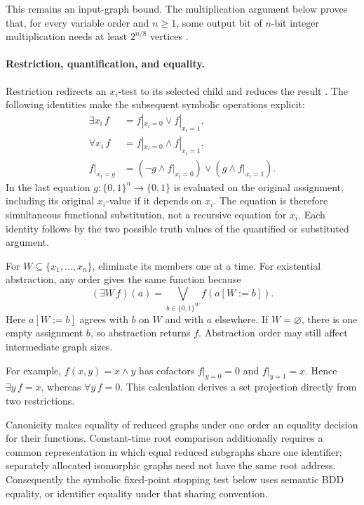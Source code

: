This remains an input-graph bound. The multiplication argument below
proves that, for every variable order and \(n\geq1\), some output bit of
\(n\)-bit integer multiplication needs at least \(2^{n/8}\) vertices
\cite[\S\S4.3, 6 and app.]{Bryant1986}.

\paragraph{Restriction, quantification, and equality.}
Restriction redirects an \(x_i\)-test to its selected child and reduces the
result \cite[\S4.4]{Bryant1986}. The following identities make the subsequent
symbolic operations explicit:
\[
\begin{aligned}
 \exists x_i\,f&=f|_{x_i=0}\lor f|_{x_i=1},\\
 \forall x_i\,f&=f|_{x_i=0}\land f|_{x_i=1},\\
 f|_{x_i=g}
   &=(\neg g\land f|_{x_i=0})\lor(g\land f|_{x_i=1}).
\end{aligned}
\]
In the last equation \(g:\{0,1\}^n\to\{0,1\}\) is evaluated on the original
assignment, including its original \(x_i\)-value if it depends on \(x_i\).
The equation is therefore simultaneous functional substitution, not a
recursive equation for \(x_i\). Each identity follows by the two possible
truth values of the quantified or substituted argument.

For \(W\subseteq\{x_1,\ldots,x_n\}\), eliminate its members one at a
time. For existential abstraction, any order gives the same function because
\[
 (\exists W\,f)(a)
 =\bigvee_{b\in\{0,1\}^{W}} f(a[W:=b]).
\]
Here \(a[W:=b]\) agrees with \(b\) on \(W\) and with \(a\) elsewhere.
If \(W=\varnothing\), there is one empty assignment \(b\), so abstraction
returns \(f\). Abstraction order may still affect intermediate graph sizes.

For example, \(f(x,y)=x\land y\) has cofactors
\(f|_{y=0}=0\) and \(f|_{y=1}=x\). Hence
\(\exists y\,f=x\), whereas \(\forall y\,f=0\).
This calculation derives a set projection directly from two restrictions.

Canonicity makes equality of reduced graphs under one order an equality
decision for their functions. Constant-time root comparison additionally
requires a common representation in which equal reduced subgraphs share one
identifier; separately allocated isomorphic graphs need not have the same
root address. Consequently the symbolic fixed-point stopping test below uses
semantic BDD equality, or identifier equality under that sharing convention.

